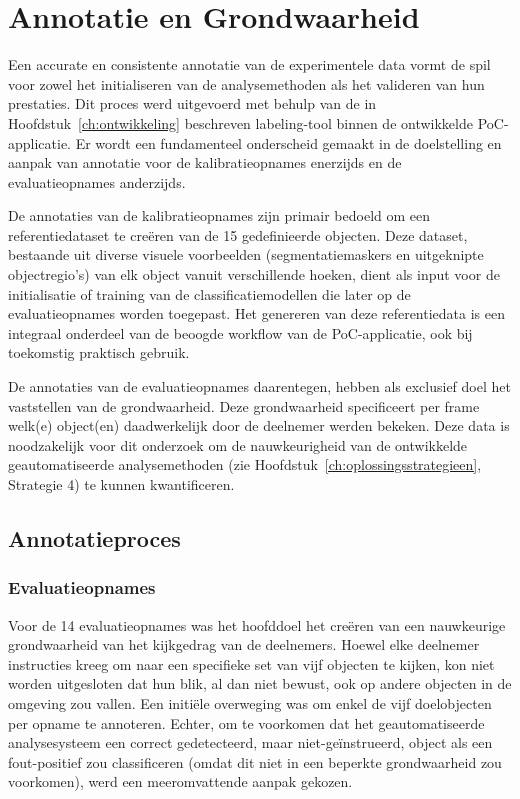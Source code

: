 \section{Annotatie en Grondwaarheid}

Een accurate en consistente annotatie van de experimentele data vormt de spil voor zowel het 
initialiseren van de analysemethoden als het valideren van hun prestaties. 
Dit proces werd uitgevoerd met behulp van de in Hoofdstuk~\ref{ch:ontwikkeling} beschreven labeling-tool binnen de ontwikkelde PoC-applicatie. 
Er wordt een fundamenteel onderscheid gemaakt in de doelstelling en aanpak van annotatie voor de 
kalibratieopnames enerzijds en de evaluatieopnames anderzijds.

De annotaties van de kalibratieopnames zijn primair bedoeld om een referentiedataset te creëren van de 15 gedefinieerde objecten. 
Deze dataset, bestaande uit diverse visuele voorbeelden (segmentatiemaskers en uitgeknipte objectregio's) 
van elk object vanuit verschillende hoeken, 
dient als input voor de initialisatie of training van de classificatiemodellen die later op de evaluatieopnames worden toegepast. 
Het genereren van deze referentiedata is een integraal onderdeel van de beoogde workflow van de PoC-applicatie, 
ook bij toekomstig praktisch gebruik.

De annotaties van de evaluatieopnames daarentegen, hebben als exclusief doel het vaststellen van de grondwaarheid. 
Deze grondwaarheid specificeert per frame welk(e) object(en) daadwerkelijk door de deelnemer werden bekeken. 
Deze data is noodzakelijk voor dit onderzoek om de nauwkeurigheid van de ontwikkelde geautomatiseerde analysemethoden 
(zie Hoofdstuk~\ref{ch:oplossingsstrategieen}, Strategie 4) te kunnen kwantificeren. 

\subsection{Annotatieproces}

\subsubsection{Evaluatieopnames}

Voor de 14 evaluatieopnames was het hoofddoel het creëren van een nauwkeurige grondwaarheid van het kijkgedrag van de deelnemers. 
Hoewel elke deelnemer instructies kreeg om naar een specifieke set van vijf objecten te kijken, kon niet worden uitgesloten dat hun blik, 
al dan niet bewust, ook op andere objecten in de omgeving zou vallen. 
Een initiële overweging was om enkel de vijf doelobjecten per opname te annoteren. 
Echter, om te voorkomen dat het geautomatiseerde analysesysteem een correct gedetecteerd, maar niet-geïnstrueerd, 
object als een fout-positief zou classificeren (omdat dit niet in een beperkte grondwaarheid zou voorkomen), 
werd een meeromvattende aanpak gekozen.

